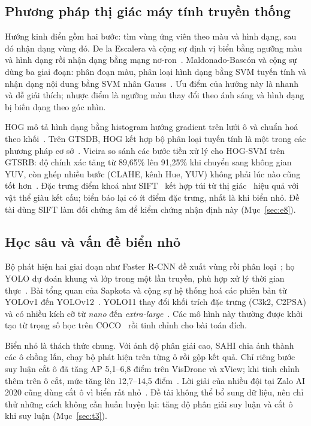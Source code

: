 \subsection{Phương pháp thị giác máy tính truyền thống}
\label{sec:rw_classic}

Hướng kinh điển gồm hai bước: tìm vùng ứng viên theo màu và hình dạng, sau đó nhận dạng vùng đó. De la Escalera và cộng sự định vị biển bằng ngưỡng màu và hình dạng rồi nhận dạng bằng mạng nơ-ron~\cite{escalera1997road}. Maldonado-Bascón và cộng sự dùng ba giai đoạn: phân đoạn màu, phân loại hình dạng bằng SVM tuyến tính và nhận dạng nội dung bằng SVM nhân Gauss~\cite{maldonado2007svm}. Ưu điểm của hướng này là nhanh và dễ giải thích; nhược điểm là ngưỡng màu thay đổi theo ánh sáng và hình dạng bị biến dạng theo góc nhìn.

HOG mô tả hình dạng bằng histogram hướng gradient trên lưới ô và chuẩn hoá theo khối~\cite{dalal2005hog}. Trên GTSDB, HOG kết hợp bộ phân loại tuyến tính là một trong các phương pháp cơ sở~\cite{houben2013gtsdb}. Vieira so sánh các bước tiền xử lý cho HOG-SVM trên GTSRB: độ chính xác tăng từ 89,65\% lên 91,25\% khi chuyển sang không gian YUV, còn ghép nhiều bước (CLAHE, kênh Hue, YUV) không phải lúc nào cũng tốt hơn~\cite{vieira2025hogsvm}. Đặc trưng điểm khoá như SIFT~\cite{lowe2004sift} kết hợp túi từ thị giác~\cite{csurka2004bovw} hiệu quả với vật thể giàu kết cấu; biển báo lại có ít điểm đặc trưng, nhất là khi biển nhỏ. Đề tài dùng SIFT làm đối chứng âm để kiểm chứng nhận định này (Mục~\ref{sec:e8}).

\subsection{Học sâu và vấn đề biển nhỏ}
\label{sec:rw_deep}

Bộ phát hiện hai giai đoạn như Faster R-CNN đề xuất vùng rồi phân loại~\cite{ren2015faster}; họ YOLO dự đoán khung và lớp trong một lần truyền, phù hợp xử lý thời gian thực~\cite{redmon2016yolo}. Bài tổng quan của Sapkota và cộng sự hệ thống hoá các phiên bản từ YOLOv1 đến YOLOv12~\cite{sapkota2025yolo}. YOLO11 thay đổi khối trích đặc trưng (C3k2, C2PSA) và có nhiều kích cỡ từ \textit{nano} đến \textit{extra-large}~\cite{khanam2024yolo11,ultralytics_yolo11}. Các mô hình này thường được khởi tạo từ trọng số học trên COCO~\cite{lin2014coco} rồi tinh chỉnh cho bài toán đích.

Biển nhỏ là thách thức chung. Với ảnh độ phân giải cao, SAHI chia ảnh thành các ô chồng lấn, chạy bộ phát hiện trên từng ô rồi gộp kết quả. Chỉ riêng bước suy luận cắt ô đã tăng AP 5,1--6,8 điểm trên VisDrone và xView; khi tinh chỉnh thêm trên ô cắt, mức tăng lên 12,7--14,5 điểm~\cite{akyon2022sahi}. Lời giải của nhiều đội tại Zalo AI 2020 cũng dùng cắt ô vì biển rất nhỏ~\cite{zalo2020tsd}. Đề tài không thể bổ sung dữ liệu, nên chỉ thử những cách không cần huấn luyện lại: tăng độ phân giải suy luận và cắt ô khi suy luận (Mục~\ref{sec:t3}).

